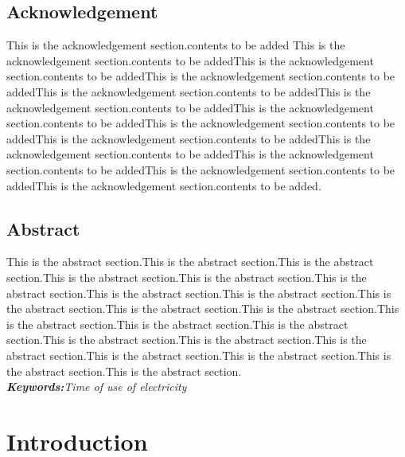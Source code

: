 \documentclass[12pt]{report}
\begin{document}
\begin{center}
\section*{Acknowledgement}
\end{center}

This is the acknowledgement section.contents to be added
This is the acknowledgement section.contents to be addedThis is the acknowledgement section.contents to be addedThis is the acknowledgement section.contents to be addedThis is the acknowledgement section.contents to be addedThis is the acknowledgement section.contents to be addedThis is the acknowledgement section.contents to be addedThis is the acknowledgement section.contents to be addedThis is the acknowledgement section.contents to be addedThis is the acknowledgement section.contents to be addedThis is the acknowledgement section.contents to be addedThis is the acknowledgement section.contents to be addedThis is the acknowledgement section.contents to be added.
\pagebreak



\section*{Abstract}%


This is the abstract section.This is the abstract section.This is the abstract section.This is the abstract section.This is the abstract section.This is the abstract section.This is the abstract section.This is the abstract section.This is the abstract section.This is the abstract section.This is the abstract section.This is the abstract section.This is the abstract section.This is the abstract section.This is the abstract section.This is the abstract section.This is the abstract section.This is the abstract section.This is the abstract section.This is the abstract section.This is the abstract section.\\
\textit{\textbf{Keywords:}Time of use of electricity}
\pagebreak

\listoffigures
\pagebreak
\listoftables
\pagebreak
\tableofcontents

\chapter{Introduction}
\end{document}
